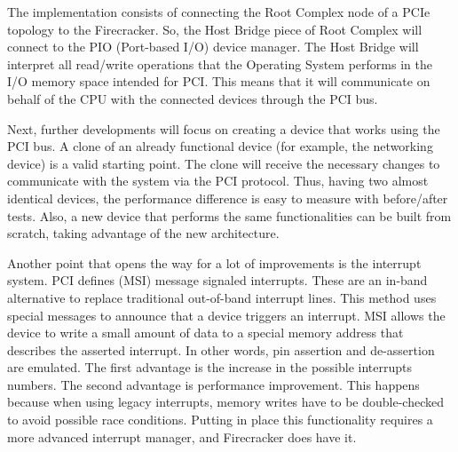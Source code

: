 \documentclass[12pt, a4paper]{report}
\begin{document}
The implementation consists of connecting the Root Complex node of a PCIe topology to the Firecracker. So, the Host Bridge piece of Root Complex will connect to the PIO (Port-based I/O) device manager. The Host Bridge will interpret all read/write operations that the Operating System performs in the I/O memory space intended for PCI. This means that it will communicate on behalf of the CPU with the connected devices through the PCI bus.

Next, further developments will focus on creating a device that works using the PCI bus. A clone of an already functional device (for example, the networking device) is a valid starting point. The clone will receive the necessary changes to communicate with the system via the PCI protocol. Thus, having two almost identical devices, the performance difference is easy to measure with before/after tests. Also, a new device that performs the same functionalities can be built from scratch, taking advantage of the new architecture.

Another point that opens the way for a lot of improvements is the interrupt system. PCI defines (MSI) message signaled interrupts. These are an in-band alternative to replace traditional out-of-band interrupt lines. This method uses special messages to announce that a device triggers an interrupt. MSI allows the device to write a small amount of data to a special memory address that describes the asserted interrupt. In other words, pin assertion and de-assertion are emulated. The first advantage is the increase in the possible interrupts numbers. The second advantage is performance improvement. This happens because when using legacy interrupts, memory writes have to be double-checked to avoid possible race conditions. Putting in place this functionality requires a more advanced interrupt manager, and Firecracker does have it.


\end{document}

